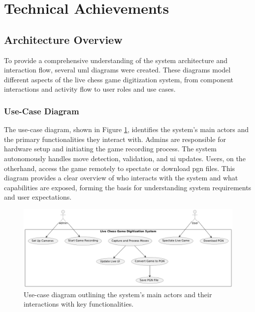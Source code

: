 \section{Technical Achievements}

\subsection{Architecture Overview}
\label{subsec:diagrams}

To provide a comprehensive understanding of the system architecture and interaction flow, several \gls{uml} diagrams were created. These diagrams model different aspects of the live chess game digitization system, from component interactions and activity flow to user roles and use cases.



\subsubsection*{Use-Case Diagram}
\label{subsubsec:use-case-diagram}

The use-case diagram, shown in Figure \ref{fig:use-case}, identifies the system’s main actors and the primary functionalities they interact with. Admins are responsible for hardware setup and initiating the game recording process. The system autonomously handles move detection, validation, and \gls{ui} updates. Users, on the otherhand, access the game remotely to spectate or download \gls{pgn} files. This diagram provides a clear overview of who interacts with the system and what capabilities are exposed, forming the basis for understanding system requirements and user expectations.

\begin{figure}[h!]
    \centering
    \includegraphics[width=0.75\linewidth]{figures/results/uml/use-case.png}
    \caption[Use-case diagram]{Use-case diagram outlining the system’s main actors and their interactions with key functionalities.}
    \label{fig:use-case}
\end{figure}  



